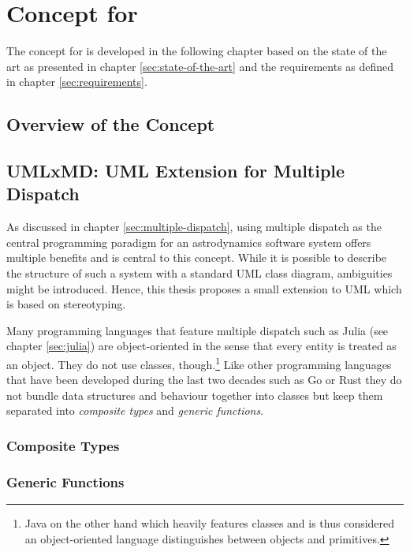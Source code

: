 \chapter{Concept for \topic}
\label{sec:concept}

The concept for \topic is developed in the following chapter based on the state of the art as presented in chapter \ref{sec:state-of-the-art} and the requirements as defined in chapter \ref{sec:requirements}.

\section{Overview of the Concept}
\label{sec:overview-concept}

\section{UMLxMD: UML Extension for Multiple Dispatch}
\label{sec:umlxmd}
As discussed in chapter \ref{sec:multiple-dispatch}, using multiple dispatch as the central programming paradigm for an astrodynamics software system offers multiple benefits and is central to this concept.
While it is possible to describe the structure of such a system with a standard UML class diagram, ambiguities might be introduced.
Hence, this thesis proposes a small extension to UML which is based on stereotyping.

Many programming languages that feature multiple dispatch such as Julia (see chapter \ref{sec:julia}) are object-oriented in the sense that every entity is treated as an object.
They do not use classes, though.\footnote{Java on the other hand which heavily features classes and is thus considered an object-oriented language distinguishes between objects and primitives.}
Like other programming languages that have been developed during the last two decades such as Go or Rust they do not bundle data structures and behaviour together into classes but keep them separated into \emph{composite types} and \emph{generic functions}.
\subsection{Composite Types}
\label{sec:composite-types}


\subsection{Generic Functions}
\label{sec:generic-functions}

